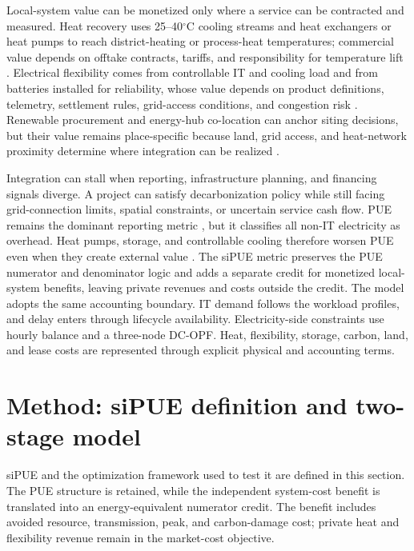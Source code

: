 \documentclass[preprint,12pt]{elsarticle}
\begin{document}
Local-system value can be monetized only where a service can be contracted and measured. Heat recovery uses 25--40$^\circ$C cooling streams and heat exchangers or heat pumps to reach district-heating or process-heat temperatures; commercial value depends on offtake contracts, tariffs, and responsibility for temperature lift \cite{11,22,23}. Electrical flexibility comes from controllable IT and cooling load and from batteries installed for reliability, whose value depends on product definitions, telemetry, settlement rules, grid-access conditions, and congestion risk \cite{13,Takci2025,Crozier2025}. Renewable procurement and energy-hub co-location can anchor siting decisions, but their value remains place-specific because land, grid access, and heat-network proximity determine where integration can be realized \cite{24,25,9}.

Integration can stall when reporting, infrastructure planning, and financing signals diverge. A project can satisfy decarbonization policy while still facing grid-connection limits, spatial constraints, or uncertain service cash flow. PUE remains the dominant reporting metric \cite{ISO30134,Belady2008PUE}, but it classifies all non-IT electricity as overhead. Heat pumps, storage, and controllable cooling therefore worsen PUE even when they create external value \cite{VandeVoort2017,Reddy2017}. The siPUE metric preserves the PUE numerator and denominator logic and adds a separate credit for monetized local-system benefits, leaving private revenues and costs outside the credit. The model adopts the same accounting boundary. IT demand follows the workload profiles, and delay enters through lifecycle availability. Electricity-side constraints use hourly balance and a three-node DC-OPF. Heat, flexibility, storage, carbon, land, and lease costs are represented through explicit physical and accounting terms.


\section{Method: siPUE definition and two-stage model}
\label{sec:methodology}

siPUE and the optimization framework used to test it are defined in this section. The PUE structure is retained, while the independent system-cost benefit is translated into an energy-equivalent numerator credit. The benefit includes avoided resource, transmission, peak, and carbon-damage cost; private heat and flexibility revenue remain in the market-cost objective.
\end{document}
